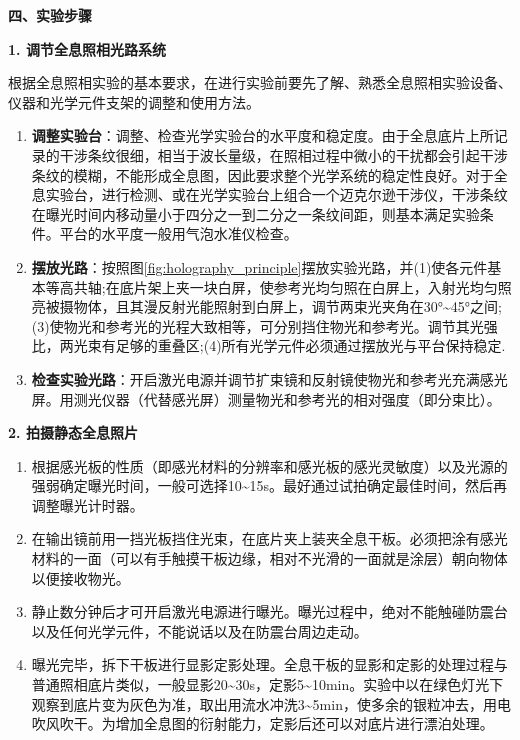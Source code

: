 ﻿\documentclass[12pt,a4paper]{article}
\begin{document}
\textbf{四、实验步骤}

\textbf{1. 调节全息照相光路系统}

根据全息照相实验的基本要求，在进行实验前要先了解、熟悉全息照相实验设备、仪器和光学元件支架的调整和使用方法。

\begin{enumerate}
    \item \textbf{调整实验台}：调整、检查光学实验台的水平度和稳定度。由于全息底片上所记录的干涉条纹很细，相当于波长量级，在照相过程中微小的干扰都会引起干涉条纹的模糊，不能形成全息图，因此要求整个光学系统的稳定性良好。对于全息实验台，进行检测、或在光学实验台上组合一个迈克尔逊干涉仪，干涉条纹在曝光时间内移动量小于四分之一到二分之一条纹间距，则基本满足实验条件。平台的水平度一般用气泡水准仪检查。

    \item \textbf{摆放光路}：按照图\ref{fig:holography_principle}摆放实验光路，并(1)使各元件基本等高共轴;在底片架上夹一块白屏，使参考光均匀照在白屏上，入射光均匀照亮被摄物体，且其漫反射光能照射到白屏上，调节两束光夹角在30°\textasciitilde45°之间;(3)使物光和参考光的光程大致相等，可分别挡住物光和参考光。调节其光强比，两光束有足够的重叠区;(4)所有光学元件必须通过摆放光与平台保持稳定.

    \item \textbf{检查实验光路}：开启激光电源并调节扩束镜和反射镜使物光和参考光充满感光屏。用测光仪器（代替感光屏）测量物光和参考光的相对强度（即分束比）。
\end{enumerate}

\textbf{2. 拍摄静态全息照片}

\begin{enumerate}
    \item 根据感光板的性质（即感光材料的分辨率和感光板的感光灵敏度）以及光源的强弱确定曝光时间，一般可选择10\textasciitilde15s。最好通过试拍确定最佳时间，然后再调整曝光计时器。

    \item 在输出镜前用一挡光板挡住光束，在底片夹上装夹全息干板。必须把涂有感光材料的一面（可以有手触摸干板边缘，相对不光滑的一面就是涂层）朝向物体以便接收物光。

    \item 静止数分钟后才可开启激光电源进行曝光。曝光过程中，绝对不能触碰防震台以及任何光学元件，不能说话以及在防震台周边走动。

    \item 曝光完毕，拆下干板进行显影定影处理。全息干板的显影和定影的处理过程与普通照相底片类似，一般显影20\textasciitilde30s，定影5\textasciitilde10min。实验中以在绿色灯光下观察到底片变为灰色为准，取出用流水冲洗3\textasciitilde5min，使多余的银粒冲去，用电吹风吹干。为增加全息图的衍射能力，定影后还可以对底片进行漂泊处理。
\end{enumerate}
\end{document}
